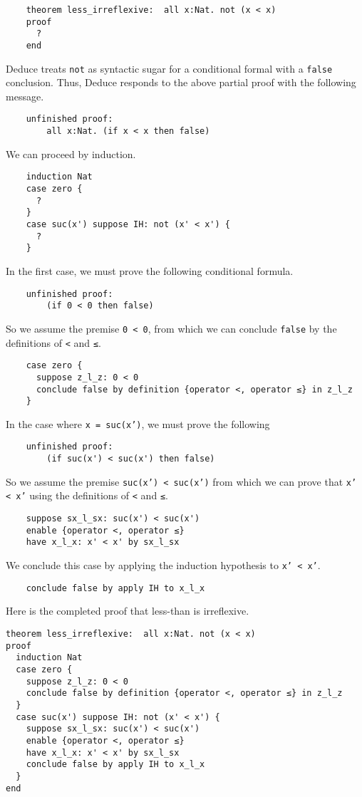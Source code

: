 \documentclass[12pt]{article}
\begin{document}
\begin{verbatim}
    theorem less_irreflexive:  all x:Nat. not (x < x)
    proof
      ?
    end
\end{verbatim}
Deduce treats \texttt{not} as syntactic sugar for a conditional formal with a
\texttt{false} conclusion. Thus, Deduce responds to the above partial proof
with the following message.
\begin{verbatim}
    unfinished proof:
        all x:Nat. (if x < x then false)
\end{verbatim}
We can proceed by induction.
\begin{verbatim}
    induction Nat
    case zero {
      ?
    }
    case suc(x') suppose IH: not (x' < x') {
      ?
    }
\end{verbatim}
In the first case, we must prove the following conditional formula.
\begin{verbatim}
    unfinished proof:
        (if 0 < 0 then false)
\end{verbatim}
So we assume the premise \texttt{0 < 0}, from which we can conclude
\texttt{false} by the definitions of \texttt{<} and \texttt{≤}.
\begin{verbatim}
    case zero {
      suppose z_l_z: 0 < 0
      conclude false by definition {operator <, operator ≤} in z_l_z
    }
\end{verbatim}
In the case where \texttt{x = suc(x')}, we must prove the following
\begin{verbatim}
    unfinished proof:
        (if suc(x') < suc(x') then false)
\end{verbatim}
So we assume the premise \texttt{suc(x') < suc(x')} from which we can
prove that \texttt{x' < x'} using the definitions of \texttt{<} and
\texttt{≤}.
\begin{verbatim}
    suppose sx_l_sx: suc(x') < suc(x')
    enable {operator <, operator ≤}
    have x_l_x: x' < x' by sx_l_sx
\end{verbatim}
We conclude this case by applying the induction hypothesis to \texttt{x' < x'}.
\begin{verbatim}
    conclude false by apply IH to x_l_x
\end{verbatim}
Here is the completed proof that less-than is irreflexive.

\begin{verbatim}
theorem less_irreflexive:  all x:Nat. not (x < x)
proof
  induction Nat
  case zero {
    suppose z_l_z: 0 < 0
    conclude false by definition {operator <, operator ≤} in z_l_z
  }
  case suc(x') suppose IH: not (x' < x') {
    suppose sx_l_sx: suc(x') < suc(x')
    enable {operator <, operator ≤}
    have x_l_x: x' < x' by sx_l_sx
    conclude false by apply IH to x_l_x
  }
end
\end{verbatim}
\end{document}
